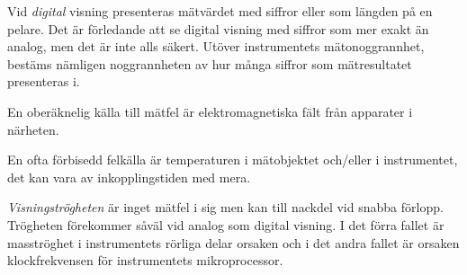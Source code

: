 Vid \emph{digital} visning presenteras mätvärdet med siffror eller som
längden på en pelare.
Det är förledande att se digital visning med siffror som mer exakt än analog,
men det är inte alls säkert.
Utöver instrumentets mätonoggrannhet, bestäms nämligen noggrannheten av hur
många siffror som mätresultatet presenteras i.

En oberäknelig källa till mätfel är elektromagnetiska fält från
apparater i närheten.

En ofta förbisedd felkälla är temperaturen i mätobjektet och/eller i
instrumentet, det kan vara av inkopplingstiden med mera.

\emph{Visningströgheten} är inget mätfel i sig men kan till nackdel
vid snabba förlopp.
Trögheten förekommer såväl vid analog som digital visning.
I det förra fallet är masströghet i instrumentets rörliga delar orsaken och i
det andra fallet är orsaken klockfrekvensen för instrumentets mikroprocessor.
